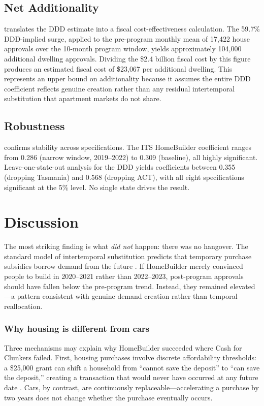 \documentclass[12pt]{article}
\begin{document}


\subsection{Net Additionality}

 translates the DDD estimate into a fiscal cost-effectiveness calculation. The 59.7\% DDD-implied surge, applied to the pre-program monthly mean of 17,422 house approvals over the 10-month program window, yields approximately 104,000 additional dwelling approvals. Dividing the \$2.4 billion fiscal cost by this figure produces an estimated fiscal cost of \$23,067 per additional dwelling. This represents an upper bound on additionality because it assumes the entire DDD coefficient reflects genuine creation rather than any residual intertemporal substitution that apartment markets do not share.



\subsection{Robustness}

 confirms stability across specifications. The ITS HomeBuilder coefficient ranges from 0.286 (narrow window, 2019--2022) to 0.309 (baseline), all highly significant. Leave-one-state-out analysis for the DDD yields coefficients between 0.355 (dropping Tasmania) and 0.568 (dropping ACT), with all eight specifications significant at the 5\% level. No single state drives the result.




\section{Discussion}
\label{sec:discussion}

The most striking finding is what \textit{did not} happen: there was no hangover. The standard model of intertemporal substitution predicts that temporary purchase subsidies borrow demand from the future \citep{mian2012, house2008}. If HomeBuilder merely convinced people to build in 2020--2021 rather than 2022--2023, post-program approvals should have fallen below the pre-program trend. Instead, they remained elevated---a pattern consistent with genuine demand creation rather than temporal reallocation.

\subsubsection*{Why housing is different from cars} Three mechanisms may explain why HomeBuilder succeeded where Cash for Clunkers failed. First, housing purchases involve discrete affordability thresholds: a \$25,000 grant can shift a household from ``cannot save the deposit'' to ``can save the deposit,'' creating a transaction that would never have occurred at any future date \citep{best2020}. Cars, by contrast, are continuously replaceable---accelerating a purchase by two years does not change whether the purchase eventually occurs.
\end{document}
